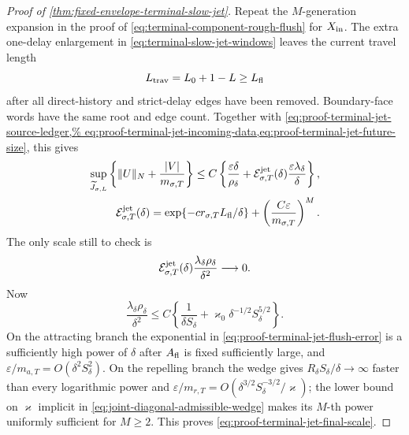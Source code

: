 \begin{proof}[Proof of
\cref{thm:fixed-envelope-terminal-slow-jet}]
Repeat the \(M\)-generation expansion in the proof of
\cref{eq:terminal-component-rough-flush} for \(X_{\rm in}\).  The
extra one-delay enlargement in
\cref{eq:terminal-slow-jet-windows} leaves the current travel length
\[
 L_{\rm trav}=L_0+1-L\ge L_{\rm fl}
\]
after all direct-history and strict-delay edges have been removed.
Boundary-face words have the same root and edge count.
Together with
\cref{eq:proof-terminal-jet-source-ledger,%
eq:proof-terminal-jet-incoming-data,eq:proof-terminal-jet-future-size},
this gives
\begin{align}
 \sup_{\widetilde J_{\sigma,L}}
 \left\{\|U\|_N+\frac{|V|}{m_{\sigma,T}}\right\}
 \le C\left\{
   \frac{\varepsilon\delta}{\rho_\delta}
   +\mathcal E_{\sigma,T}^{\rm jet}(\delta)
       \frac{\varepsilon\lambda_\delta}{\delta}\right\},
                                                        \label{eq:proof-terminal-jet-flushed-tangent}\\
 \mathcal E_{\sigma,T}^{\rm jet}(\delta)
 =\exp\{-cr_{\sigma,T}L_{\rm fl}/\delta\}
   +\left(\frac{C\varepsilon}{m_{\sigma,T}}\right)^M.
                                                        \label{eq:proof-terminal-jet-flush-error}
\end{align}
The only scale still to check is
\begin{equation}
 \mathcal E_{\sigma,T}^{\rm jet}(\delta)
       \frac{\lambda_\delta\rho_\delta}{\delta^2}
 \longrightarrow0.                              \label{eq:proof-terminal-jet-final-scale}
\end{equation}
Now
\[
 \frac{\lambda_\delta\rho_\delta}{\delta^2}
 \le C\left\{\frac1{\delta S_\delta}
       +\varkappa_0\delta^{-1/2}S_\delta^{5/2}\right\}.
\]
On the attracting branch the exponential in
\cref{eq:proof-terminal-jet-flush-error} is a sufficiently high power of
\(\delta\) after \(A_{\rm fl}\) is fixed sufficiently large, and
\(\varepsilon/m_{a,T}=O(\delta^2S_\delta^2)\).  On the repelling branch
the wedge gives \(R_\delta S_\delta/\delta\to\infty\) faster than every
logarithmic power and
\(\varepsilon/m_{r,T}=O(\delta^{3/2}S_\delta^{-3/2}/\varkappa)\);
the lower bound on \(\varkappa\) implicit in
\cref{eq:joint-diagonal-admissible-wedge} makes its \(M\)-th power
uniformly sufficient for \(M\ge2\).  This proves
\cref{eq:proof-terminal-jet-final-scale}.


\end{proof}
